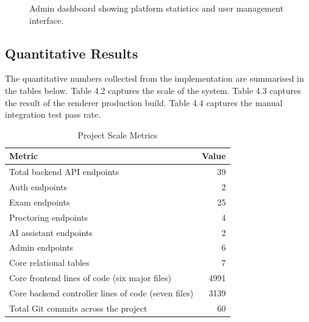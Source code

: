\documentclass[12pt, a4paper]{report}
\begin{document}
\begin{figure}[t]
\centering
{}
\caption{Admin dashboard showing platform statistics and user management interface.}
\label{fig:4.4}
\end{figure}

\subsection{Quantitative Results}

\begin{justify}
  {\fontsize{12}{18}\selectfont
    The quantitative numbers collected from the implementation are summarised in the tables below. Table 4.2 captures the scale of the system. Table 4.3 captures the result of the renderer production build. Table 4.4 captures the manual integration test pass rate.
  }
\end{justify}

\begin{table}[H]
  \caption{Project Scale Metrics}
  \label{tab:4.2}
  \centering
  {\fontsize{11}{14}\selectfont
    \begin{tabular}{|p{3in}|r|}
      \hline
      \textbf{Metric} & \textbf{Value} \\
      \hline
      Total backend API endpoints & 39 \\
      \hline
      Auth endpoints & 2 \\
      \hline
      Exam endpoints & 25 \\
      \hline
      Proctoring endpoints & 4 \\
      \hline
      AI assistant endpoints & 2 \\
      \hline
      Admin endpoints & 6 \\
      \hline
      Core relational tables & 7 \\
      \hline
      Core frontend lines of code (six major files) & 4991 \\
      \hline
      Core backend controller lines of code (seven files) & 3139 \\
      \hline
      Total Git commits across the project & 60 \\
      \hline
    \end{tabular}
  }
\end{table}
\end{document}
